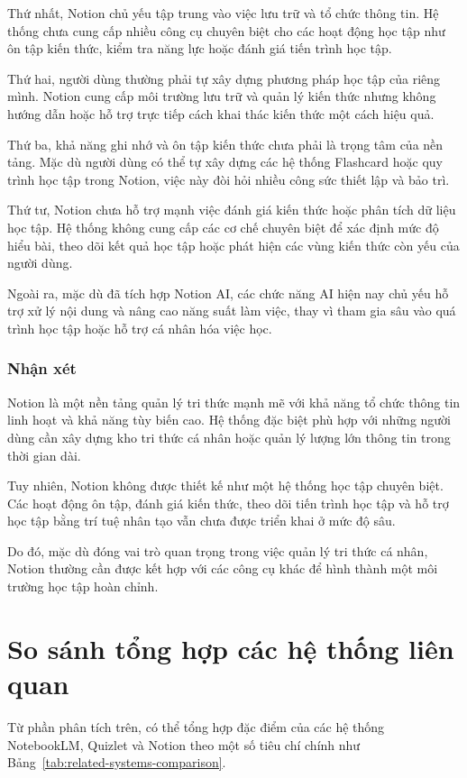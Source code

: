 Thứ nhất, Notion chủ yếu tập trung vào việc lưu trữ và tổ chức thông tin. Hệ thống chưa cung cấp nhiều công cụ chuyên biệt cho các hoạt động học tập như ôn tập kiến thức, kiểm tra năng lực hoặc đánh giá tiến trình học tập.

Thứ hai, người dùng thường phải tự xây dựng phương pháp học tập của riêng mình. Notion cung cấp môi trường lưu trữ và quản lý kiến thức nhưng không hướng dẫn hoặc hỗ trợ trực tiếp cách khai thác kiến thức một cách hiệu quả.

Thứ ba, khả năng ghi nhớ và ôn tập kiến thức chưa phải là trọng tâm của nền tảng. Mặc dù người dùng có thể tự xây dựng các hệ thống Flashcard hoặc quy trình học tập trong Notion, việc này đòi hỏi nhiều công sức thiết lập và bảo trì.

Thứ tư, Notion chưa hỗ trợ mạnh việc đánh giá kiến thức hoặc phân tích dữ liệu học tập. Hệ thống không cung cấp các cơ chế chuyên biệt để xác định mức độ hiểu bài, theo dõi kết quả học tập hoặc phát hiện các vùng kiến thức còn yếu của người dùng.

Ngoài ra, mặc dù đã tích hợp Notion AI, các chức năng AI hiện nay chủ yếu hỗ trợ xử lý nội dung và nâng cao năng suất làm việc, thay vì tham gia sâu vào quá trình học tập hoặc hỗ trợ cá nhân hóa việc học.

\subsubsection{Nhận xét}

Notion là một nền tảng quản lý tri thức mạnh mẽ với khả năng tổ chức thông tin linh hoạt và khả năng tùy biến cao. Hệ thống đặc biệt phù hợp với những người dùng cần xây dựng kho tri thức cá nhân hoặc quản lý lượng lớn thông tin trong thời gian dài.

Tuy nhiên, Notion không được thiết kế như một hệ thống học tập chuyên biệt. Các hoạt động ôn tập, đánh giá kiến thức, theo dõi tiến trình học tập và hỗ trợ học tập bằng trí tuệ nhân tạo vẫn chưa được triển khai ở mức độ sâu.

Do đó, mặc dù đóng vai trò quan trọng trong việc quản lý tri thức cá nhân, Notion thường cần được kết hợp với các công cụ khác để hình thành một môi trường học tập hoàn chỉnh.


\section{So sánh tổng hợp các hệ thống liên quan}

Từ phần phân tích trên, có thể tổng hợp đặc điểm của các hệ thống NotebookLM, Quizlet và Notion theo một số tiêu chí chính như Bảng~\ref{tab:related-systems-comparison}.

